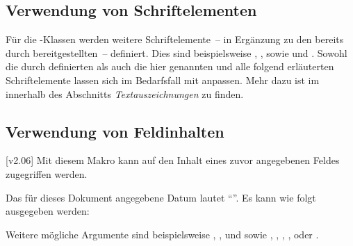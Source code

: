 \begin{DeclareEntity*}{}
\begin{DeclareEntity*}{}
\begin{DeclareEntity*}{}
\subsection{%
  Verwendung von Schriftelementen%
  \label{sec:fonts:elements}%
}
%
Für die \TUDScript-Klassen werden weitere Schriftelemente~-- in Ergänzung zu 
den bereits durch \KOMAScript bereitgestellten~-- definiert. Dies sind 
beispielsweise , ,  sowie 
 und . Sowohl die durch \KOMAScript 
definierten als auch die hier genannten und alle folgend erläuterten 
Schriftelemente lassen sich im Bedarfsfall mit 
 anpassen. 
Mehr dazu ist im \scrguide innerhalb des Abschnitts \emph{Textauszeichnungen} 
zu finden.

\begin{quoting}[rightmargin=0pt]
\begin{Code}[escapechar=§]
\end{Code}
\end{quoting}



\subsection{%
  Verwendung von Feldinhalten%
}
%
\begin{Declaration}
  {}
  [v2.06]
\printdeclarationlist
%
Mit diesem Makro kann auf den Inhalt eines zuvor angegebenen Feldes zugegriffen 
werden.
%
\begin{Example}
Das für dieses Dokument angegebene Datum lautet \enquote{}. Es 
kann wie folgt ausgegeben werden:
\begin{Code}
\end{Code}
\end{Example}
%
Weitere mögliche Argumente sind beispielsweise , 
,  und  sowie ,
, , ,  oder
.
\end{Declaration}




\end{DeclareEntity*}
\end{DeclareEntity*}
\end{DeclareEntity*}
